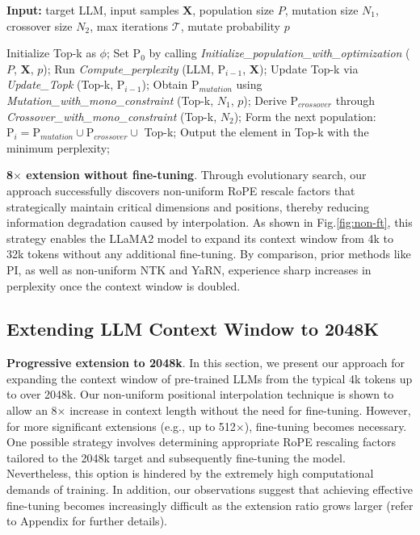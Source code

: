 \begin{algorithm}[t]
	\small
	\caption{The search algorithm}
	\textbf{Input:} target LLM, input samples $\mathbf{X}$,   population size $P$, mutation size $N_1$, crossover size $N_2$, max iterations $\mathcal{T}$, mutate probability $p$\\

	\begin{algorithmic}[1]
		\label{alg:search}
		\STATE Initialize Top-k as $\phi$;	
		\STATE Set $\text{P}_0$ by calling \textit{Initialize\_population\_with\_optimization} ($P$, $\mathbf{X}$, $p$); 
		\STATE Run \textit{Compute\_perplexity} (LLM, $\text{P}_{i-1}$, $\mathbf{X}$);
		\STATE  Update Top-k via \textit{Update\_Topk} (Top-k, $\text{P}_{i-1}$);
		\STATE Obtain $\text{P}_{mutation}$ using \textit{Mutation\_with\_mono\_constraint} (Top-k, $N_1$, $p$); 
		\STATE Derive $\text{P}_{crossover}$ through \textit{Crossover\_with\_mono\_constraint} (Top-k, $N_2$);
		\STATE Form the next population: $\text{P}_i = \text{P}_{mutation} \cup \text{P}_{crossover} \cup$ Top-k;
		\ENDFOR
		\STATE Output the element in Top-k with the minimum perplexity;
	\end{algorithmic}
\end{algorithm}

\textbf{8$\times$ extension without fine-tuning}. Through evolutionary search, our approach successfully discovers non-uniform RoPE rescale factors that strategically maintain critical dimensions and positions, thereby reducing information degradation caused by interpolation. As shown in Fig.\ref{fig:non-ft}, this strategy enables the LLaMA2 model to expand its context window from 4k to 32k tokens without any additional fine-tuning. By comparison, prior methods like PI, as well as non-uniform NTK and YaRN, experience sharp increases in perplexity once the context window is doubled.

\subsection{Extending LLM Context Window to 2048K}
\label{sec:extendto2048k}

\textbf{Progressive extension to 2048k}. In this section, we present our approach for expanding the context window of pre-trained LLMs from the typical 4k tokens up to over 2048k. Our non-uniform positional interpolation technique is shown to allow an 8$\times$ increase in context length without the need for fine-tuning. However, for more significant extensions (e.g., up to 512$\times$), fine-tuning becomes necessary. One possible strategy involves determining appropriate RoPE rescaling factors tailored to the 2048k target and subsequently fine-tuning the model. Nevertheless, this option is hindered by the extremely high computational demands of training. In addition, our observations suggest that achieving effective fine-tuning becomes increasingly difficult as the extension ratio grows larger (refer to Appendix for further details).

